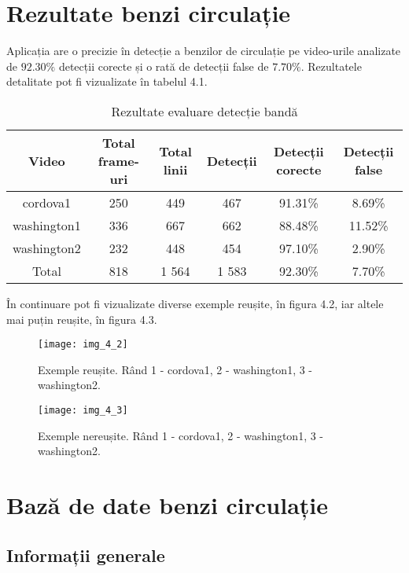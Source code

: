 \section{Rezultate benzi circulație}

Aplicația are o precizie în detecție a benzilor de circulație pe video-urile analizate de $92.30\%$ detecții corecte și o rată de detecții false de $7.70\%$. Rezultatele detalitate pot fi vizualizate în tabelul 4.1.

\begin{table}[h!]
	\centering
	\begin{tabular}{||c | c | c | c | c | c ||} 
		\hline
		Video & Total frame-uri & Total linii & Detecții & Detecții corecte & Detecții false \\ [0.5ex] 
		\hline\hline
		cordova1 & 250 & 449 & 467 & 91.31\% & 8.69\%  \\ 
		washington1 & 336 & 667 & 662 & 88.48\% & 11.52\% \\
		washington2 & 232 & 448 & 454 & 97.10\% & 2.90\%  \\ 
		\hline\hline
		Total & 818 & 1 564 & 1 583 & 92.30\% & 7.70\% \\ [1ex]
		
		\hline
	\end{tabular}
	\caption{Rezultate evaluare detecție bandă}
	\label{table:1}
\end{table}

În continuare pot fi vizualizate diverse exemple reușite, în figura 4.2, iar altele mai puțin reușite, în figura 4.3.

\begin{figure}[!h]
	\centering
	\texttt{[image: img\_4\_2]}
	\caption[Detecție bandă - exemple reușite]{Exemple reușite. Rând 1 - cordova1, 2 - washington1, 3 - washington2.}
\end{figure}
\begin{figure}[!h]
	\centering
	\texttt{[image: img\_4\_3]}
	\caption[Detecție bandă - exemple nereușite]{Exemple nereușite. Rând 1 - cordova1, 2 - washington1, 3 - washington2.}
\end{figure}

\section{Bază de date benzi circulație}
\subsection*{Informații generale}

